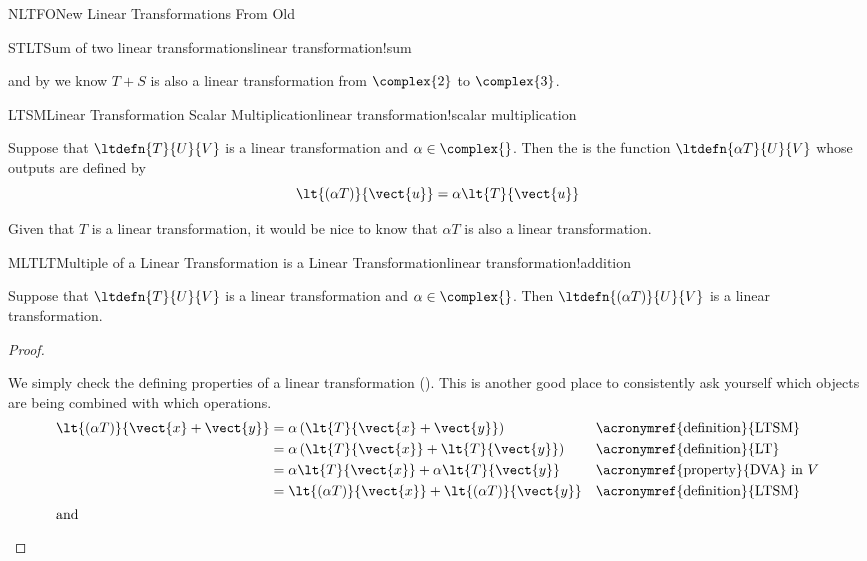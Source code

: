 \begin{subsect}{NLTFO}{New Linear Transformations From Old}
\begin{example}{STLT}{Sum of two linear transformations}{linear transformation!sum}
\begin{para}
\begin{equation*}
\end{equation*}
%
and by  we know $T+S$ is also a linear transformation from $\complex{2}$ to $\complex{3}$.
\end{para}
%
\end{example}
%
\begin{definition}{LTSM}{Linear Transformation Scalar Multiplication}{linear transformation!scalar multiplication}
\begin{para}Suppose that $\ltdefn{T}{U}{V}$ is a linear transformation and $\alpha\in\complex{\null}$.  Then the  is the function $\ltdefn{\alpha T}{U}{V}$ whose outputs are defined by
%
\begin{equation*}
\lt{(\alpha T)}{\vect{u}}=\alpha\lt{T}{\vect{u}}
\end{equation*}
\end{para}
%
\end{definition}
%
\begin{para}Given that $T$ is a linear transformation, it would be nice to know that $\alpha T$ is also a linear transformation.\end{para}
%
\begin{theorem}{MLTLT}{Multiple of a Linear Transformation is a Linear Transformation}{linear transformation!addition}
\begin{para}Suppose that $\ltdefn{T}{U}{V}$ is a linear transformation and $\alpha\in\complex{\null}$.  Then $\ltdefn{(\alpha T)}{U}{V}$ is a linear transformation.\end{para}
\end{theorem}
%
\begin{proof}
\begin{para}We simply check the defining properties of a linear transformation ().  This is another good place to consistently ask yourself which objects are being combined with which operations.
%
\begin{align*}
\lt{(\alpha T)}{\vect{x}+\vect{y}}&=
\alpha\left(\lt{T}{\vect{x}+\vect{y}}\right)&&\text{\acronymref{definition}{LTSM}}\\
&=\alpha\left(\lt{T}{\vect{x}}+\lt{T}{\vect{y}}\right)&&\text{\acronymref{definition}{LT}}\\
&=\alpha\lt{T}{\vect{x}}+\alpha\lt{T}{\vect{y}}&&\text{\acronymref{property}{DVA} in $V$}\\
&=\lt{(\alpha T)}{\vect{x}}+\lt{(\alpha T)}{\vect{y}}&&\text{\acronymref{definition}{LTSM}}\\
%
\intertext{and}

\end{align*}
\end{para}
\end{proof}
\end{subsect}
